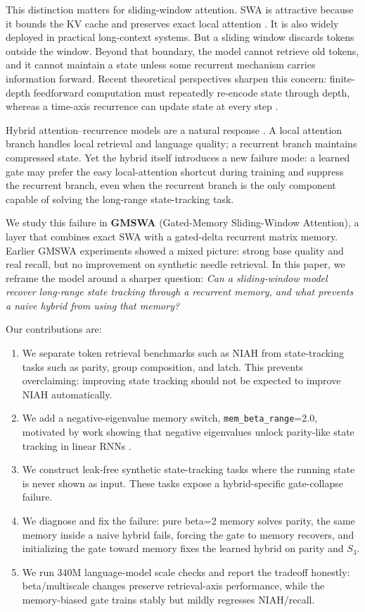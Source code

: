 \documentclass[letterpaper]{article}
\begin{document}
This distinction matters for sliding-window attention. SWA is attractive because it bounds the KV cache and preserves exact local attention \citep{beltagy2020longformer,jiang2023mistral}. It is also widely deployed in practical long-context systems. But a sliding window discards tokens outside the window. Beyond that boundary, the model cannot retrieve old tokens, and it cannot maintain a state unless some recurrent mechanism carries information forward. Recent theoretical perspectives sharpen this concern: finite-depth feedforward computation must repeatedly re-encode state through depth, whereas a time-axis recurrence can update state at every step \citep{mozer2026topological}.

Hybrid attention--recurrence models are a natural response \citep{de2024griffin,lieber2024jamba,ren2024samba,glorioso2024zamba,arora2024based,dong2024hymba}. A local attention branch handles local retrieval and language quality; a recurrent branch maintains compressed state. Yet the hybrid itself introduces a new failure mode: a learned gate may prefer the easy local-attention shortcut during training and suppress the recurrent branch, even when the recurrent branch is the only component capable of solving the long-range state-tracking task.

We study this failure in \textbf{GMSWA} (Gated-Memory Sliding-Window Attention), a layer that combines exact SWA with a gated-delta recurrent matrix memory. Earlier GMSWA experiments showed a mixed picture: strong base quality and real recall, but no improvement on synthetic needle retrieval. In this paper, we reframe the model around a sharper question: \emph{Can a sliding-window model recover long-range state tracking through a recurrent memory, and what prevents a naive hybrid from using that memory?}

Our contributions are:
\begin{enumerate}
  \item We separate token retrieval benchmarks such as NIAH from state-tracking tasks such as parity, group composition, and latch. This prevents overclaiming: improving state tracking should not be expected to improve NIAH automatically.
  \item We add a negative-eigenvalue memory switch, \texttt{mem\_beta\_range}=2.0, motivated by work showing that negative eigenvalues unlock parity-like state tracking in linear RNNs \citep{grazzi2024unlocking}.
  \item We construct leak-free synthetic state-tracking tasks where the running state is never shown as input. These tasks expose a hybrid-specific gate-collapse failure.
  \item We diagnose and fix the failure: pure beta=2 memory solves parity, the same memory inside a naive hybrid fails, forcing the gate to memory recovers, and initializing the gate toward memory fixes the learned hybrid on parity and $S_3$.
  \item We run 340M language-model scale checks and report the tradeoff honestly: beta/multiscale changes preserve retrieval-axis performance, while the memory-biased gate trains stably but mildly regresses NIAH/recall.
\end{enumerate}
\end{document}
